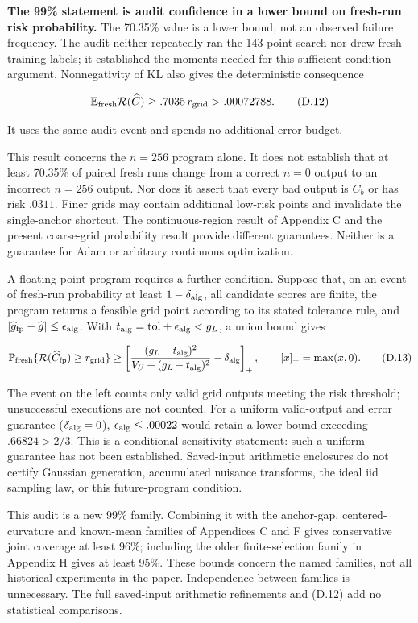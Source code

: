 \documentclass{article}
\begin{document}
\textbf{The 99\% statement is audit confidence in a lower bound on
fresh-run risk probability.} The 70.35\% value is a lower bound, not an
observed failure frequency. The audit neither repeatedly ran the
143-point search nor drew fresh training labels; it established the
moments needed for this sufficient-condition argument. Nonnegativity of
KL also gives the deterministic consequence

\[
\mathbb E_{\rm fresh}\mathcal R(\widehat C)
\ge .7035\,r_{\rm grid}>.00072788.
\tag{D.12}
\]

It uses the same audit event and spends no additional error budget.

This result concerns the \(n=256\) program alone. It does not establish
that at least 70.35\% of paired fresh runs change from a correct \(n=0\)
output to an incorrect \(n=256\) output. Nor does it assert that every
bad output is \(C_b\) or has risk \(.0311\). Finer grids may contain
additional low-risk points and invalidate the single-anchor shortcut.
The continuous-region result of Appendix C and the present coarse-grid
probability result provide different guarantees. Neither is a guarantee
for Adam or arbitrary continuous optimization.

A floating-point program requires a further condition. Suppose that, on
an event of fresh-run probability at least \(1-\delta_{\rm alg}\), all
candidate scores are finite, the program returns a feasible grid point
according to its stated tolerance rule, and
\(|\widehat g_{\rm fp}-\widehat g|\le\epsilon_{\rm alg}\). With
\(t_{\rm alg}=\mathrm{tol}+\epsilon_{\rm alg}<g_L\), a union bound gives

\[
\mathbb P_{\rm fresh}\{\mathcal R(\widehat C_{\rm fp})\ge r_{\rm grid}\}
\ge\left[
\frac{(g_L-t_{\rm alg})^2}{V_U+(g_L-t_{\rm alg})^2}
-\delta_{\rm alg}\right]_+,\qquad [x]_+=\max(x,0).
\tag{D.13}
\]

The event on the left counts only valid grid outputs meeting the risk
threshold; unsuccessful executions are not counted. For a uniform
valid-output and error guarantee (\(\delta_{\rm alg}=0\)),
\(\epsilon_{\rm alg}\le.00022\) would retain a lower bound exceeding
\(.66824>2/3\). This is a conditional sensitivity statement: such a
uniform guarantee has not been established. Saved-input arithmetic
enclosures do not certify Gaussian generation, accumulated nuisance
transforms, the ideal iid sampling law, or this future-program
condition.

This audit is a new 99\% family. Combining it with the anchor-gap,
centered-curvature and known-mean families of Appendices C and F gives
conservative joint coverage at least 96\%; including the older
finite-selection family in Appendix H gives at least 95\%. These bounds
concern the named families, not all historical experiments in the paper.
Independence between families is unnecessary. The full saved-input
arithmetic refinements and (D.12) add no statistical comparisons.
\end{document}
